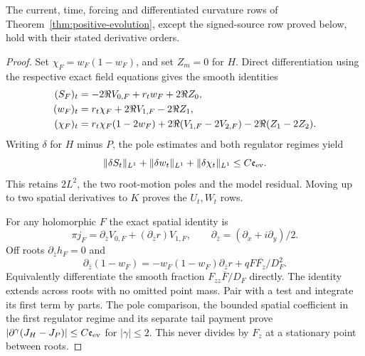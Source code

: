 \begin{proposition}
\label{prop:positive-direct-evolution}
The current, time, forcing and differentiated curvature rows of
Theorem~\ref{thm:positive-evolution}, except the signed-source row
proved below, hold with their stated derivative orders.
\end{proposition}
\begin{proof}
Set $\chi_F=w_F(1-w_F)$, and set $Z_m=0$ for $H$.
Direct differentiation using the respective exact field equations gives
the smooth identities
\begin{align}
 (S_F)_t&=-2\Re V_{0,F}+r_tw_F+2\Re Z_0,\notag\\
 (w_F)_t&=r_t\chi_F+2\Re V_{1,F}-2\Re Z_1,\notag\\
 (\chi_F)_t&=r_t\chi_F(1-2w_F)
       +2\Re(V_{1,F}-2V_{2,F})-2\Re(Z_1-2Z_2).
 \label{eq:positive-direct-time}
\end{align}
Writing $\delta$ for $H$ minus $P$, the pole estimates and both
regulator regimes yield
\begin{equation}
 \|\delta S_t\|_{L^1}+\|\delta w_t\|_{L^1}
             +\|\delta\chi_t\|_{L^1}\le C\mathfrak e_{\rm ev}.
 \label{eq:positive-time-L1}
\end{equation}
This retains $2L^2$, the two root-motion poles and the model residual.
Moving up to two spatial derivatives to $K$ proves the $U_t,W_t$ rows.

For any holomorphic $F$ the exact spatial identity is
\begin{equation}
 \pi j_F=\partial_{\bar z}V_{0,F}
                    +(\partial_{\bar z}r)V_{1,F},\qquad
 \partial_{\bar z}=(\partial_x+i\partial_y)/2.
 \label{eq:positive-weak-current}
\end{equation}
Off roots $\partial_{\bar z}h_F=0$ and
\[
 \partial_{\bar z}(1-w_F)
 =-w_F(1-w_F)\partial_{\bar z}r
                      +qF\overline{F_z}/D_F^2.
\]
Equivalently differentiate the smooth fraction
$F_{zz}\overline F/D_F$ directly. The identity extends across roots
with no omitted point mass. Pair with a test and integrate its first
term by parts. The pole comparison, the bounded spatial coefficient
in the first regulator regime and its separate tail payment prove
$|\partial^\gamma(J_H-J_P)|\le C\mathfrak e_{\rm ev}$ for
$|\gamma|\le2$. This never divides by $F_z$ at a stationary point
between roots.


\end{proof}
